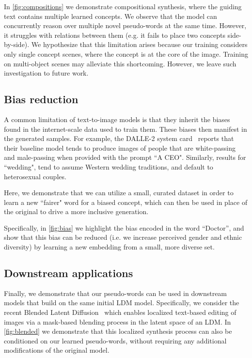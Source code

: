 In \ref{fig:compositions} we demonstrate compositional synthesis, where the guiding text contains multiple learned concepts. We observe that the model can concurrently reason over multiple novel pseudo-words at the same time. However, it struggles with relations between them (e.g. it fails to place two concepts side-by-side). We hypothesize that this limitation arises because our training considers only single concept scenes, where the concept is at the core of the image. Training on multi-object scenes may alleviate this shortcoming. However, we leave such investigation to future work.

\subsection{Bias reduction}

A common limitation of text-to-image models is that they inherit the biases found in the internet-scale data used to train them. These biases then manifest in the generated samples. For example, the DALLE-2 system card~\citep{mishkin2022risks} reports that their baseline model tends to produce images of people that are white-passing and male-passing when provided with the prompt ``A CEO". Similarly, results for ``wedding", tend to assume Western wedding traditions, and default to heterosexual couples.

Here, we demonstrate that we can utilize a small, curated dataset in order to learn a new ``fairer" word for a biased concept, which can then be used in place of the original to drive a more inclusive generation.

Specifically, in \ref{fig:bias} we highlight the bias encoded in the word ``Doctor'', and show that this bias can be reduced (i.e. we increase perceived gender and ethnic diversity) by learning a new embedding from a small, more diverse set.

\subsection{Downstream applications}

Finally, we demonstrate that our pseudo-words can be used in downstream models that build on the same initial LDM model. Specifically, we consider the recent Blended Latent Diffusion~\citep{avrahami2022blendedlatent} which enables localized text-based editing of images via a mask-based blending process in the latent space of an LDM. In \ref{fig:blended} we demonstrate that this localized synthesis process can also be conditioned on our learned pseudo-words, without requiring any additional modifications of the original model. 

